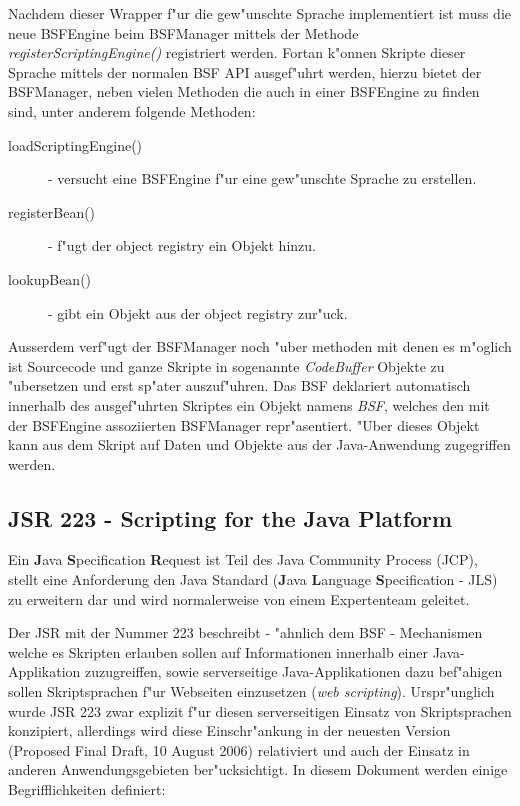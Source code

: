 Nachdem dieser Wrapper f"ur die gew"unschte Sprache implementiert ist muss die neue BSFEngine beim BSFManager mittels der
Methode \emph{registerScriptingEngine()} registriert werden. Fortan k"onnen Skripte dieser Sprache mittels der normalen
BSF API ausgef"uhrt werden, hierzu bietet der BSFManager, neben vielen Methoden die auch in einer BSFEngine zu finden sind,
unter anderem folgende Methoden:
\begin{description}
    \item[loadScriptingEngine()] - versucht eine BSFEngine f"ur eine gew"unschte Sprache zu erstellen.
    \item[registerBean()] - f"ugt der object registry ein Objekt hinzu.
    \item[lookupBean()] - gibt ein Objekt aus der object registry zur"uck.
\end{description}
Ausserdem verf"ugt der BSFManager noch "uber methoden mit denen es m"oglich ist Sourcecode und ganze Skripte in sogenannte
\emph{CodeBuffer} Objekte zu "ubersetzen und erst sp"ater auszuf"uhren.
Das BSF deklariert automatisch innerhalb des ausgef"uhrten Skriptes ein Objekt namens \emph{BSF}, welches den mit der
BSFEngine assoziierten BSFManager repr"asentiert. "Uber dieses Objekt kann aus dem Skript auf Daten und Objekte aus der
Java-Anwendung zugegriffen werden.

\subsection{JSR 223 - Scripting for the Java Platform}
\label{sec:chap1:ana:jsr}

Ein \textbf{J}ava \textbf{S}pecification \textbf{R}equest ist Teil des Java Community Process (JCP), stellt
eine Anforderung den Java Standard (\textbf{J}ava \textbf{L}anguage \textbf{S}pecification - JLS) zu erweitern dar und wird 
normalerweise von einem Expertenteam geleitet.

Der JSR mit der Nummer 223 \cite{JSRHP} beschreibt - "ahnlich dem BSF - Mechanismen welche es Skripten erlauben sollen auf Informationen
innerhalb einer Java-Applikation zuzugreiffen, sowie serverseitige Java-Applikationen dazu bef"ahigen sollen Skriptsprachen f"ur Webseiten 
einzusetzen (\emph{web scripting}). Urspr"unglich wurde JSR 223 zwar explizit f"ur diesen serverseitigen Einsatz von Skriptsprachen 
konzipiert, allerdings wird diese Einschr"ankung in der neuesten Version (Proposed Final Draft, 10 August 2006) relativiert
und auch der Einsatz in anderen Anwendungsgebieten ber"ucksichtigt. In diesem Dokument werden einige Begrifflichkeiten definiert:

